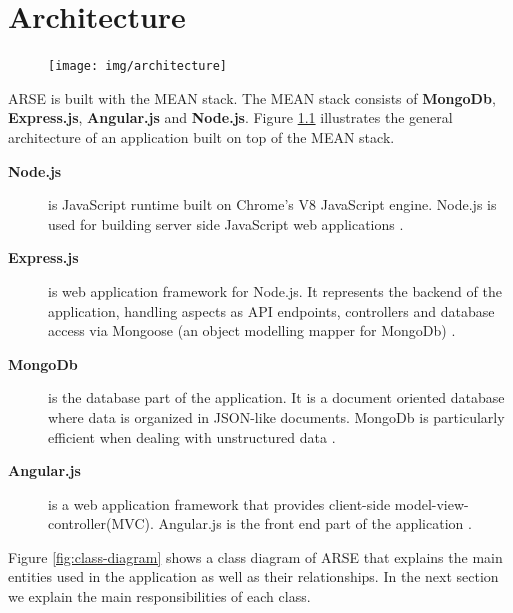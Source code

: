 \documentclass[
	accentcolor=tud1a %
]{tudreport}
\begin{document}
\chapter{Architecture}
\label{ch:architecture}

\begin{figure}
  \centering
    \texttt{[image: img/architecture]}
    \label{fig:architecture}
\end{figure}
ARSE is built with the MEAN stack. The MEAN stack consists of \textbf{MongoDb}, \textbf{Express.js}, \textbf{Angular.js} and \textbf{Node.js}. Figure \ref{fig:architecture} illustrates the general architecture of an application built on top of the MEAN stack.

\begin{description}
\item[\textbf{Node.js}] is JavaScript runtime built on Chrome's V8 JavaScript engine. Node.js is used for building server side JavaScript web applications \cite{NJS}.
\item[\textbf{Express.js}] is web application framework for Node.js. It represents the backend of the application, handling aspects as API endpoints, controllers and database access via Mongoose (an object modelling mapper for MongoDb) \cite{EXJS}.
\item[\textbf{MongoDb}] is the database part of the application. It is a document oriented database where data is organized in JSON-like documents. MongoDb is particularly efficient when dealing with unstructured data \cite{MDB}.
\item[\textbf{Angular.js}] is a web application framework that provides client-side model-view-controller(MVC). Angular.js is the front end part of the application \cite{AJS}.

\end{description}

Figure \ref{fig:class-diagram} shows a class diagram of ARSE that explains the main entities used in the application as well as their relationships. In the next section we explain the main responsibilities of each class. 
\end{document}
